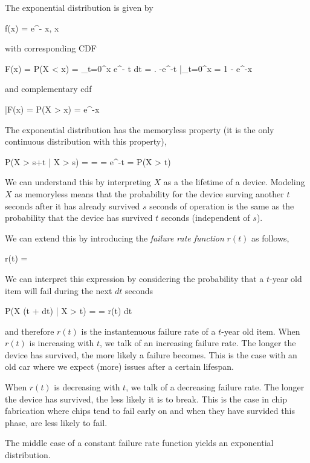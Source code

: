 
The exponential distribution is given by

\bee
f(x) = \lambda e^{- \lambda x}, \quad x 
\eee

with corresponding CDF

\bee
F(x) = P(X < x) = \int_{t=0}^x \lambda e^{- \lambda t} dt = \left. -e^{-\lambda t} \right|_{t=0}^x = 1 - e^{-\lambda x}
\eee

and complementary cdf

\bee
\bar F(x) = P(X > x) = e^{-\lambda x} 
\eee

The exponential distribution has the memoryless property (it is the only continuous distribution with this property),

\bee
P(X > s+t | X > s) =  =  = e^{-\lambda t} = P(X > t)
\eee

We can understand this by interpreting $X$ as a the lifetime of a device. Modeling $X$ as memoryless means that the probability for the device surving another $t$ seconds after it has already survived $s$ seconds of operation is the same as the probability that the device has survived $t$ seconds (independent of $s$).

We can extend this by introducing the \emph{failure rate function} $r(t)$ as follows,

\bee
r(t) = 
\eee

We can interpret this expression by considering the probability that a $t$-year old item will fail during the next $dt$ seconds

\bee
P(X \in (t + dt) | X > t) =  \approx {} = r(t) dt
\eee

and therefore $r(t)$ is the instantenuous failure rate of a $t$-year old item. When $r(t)$ is increasing with $t$, we talk of an increasing failure rate. The longer the device has survived, the more likely a failure becomes. This is the case with an old car where we expect (more) issues after a certain lifespan.

When $r(t)$ is decreasing with $t$, we talk of a decreasing failure rate. The longer the device has survived, the less likely it is to break. This is the case in chip fabrication where chips tend to fail early on and when they have survided this phase, are less likely to fail.

The middle case of a constant failure rate function yields an exponential distribution.


